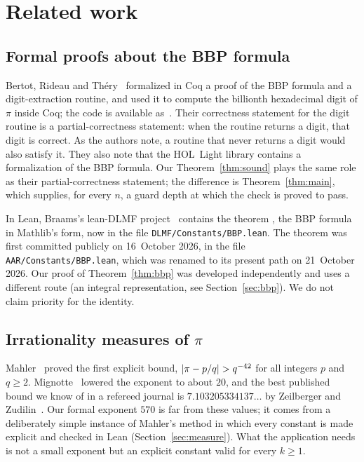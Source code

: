 \documentclass[11pt]{amsart}
\theoremstyle{definition}
\theoremstyle{remark}
\DeclarePairedDelimiter{\abs}{\lvert}{\rvert}
\begin{document}
\section{Related work}\label{sec:related}

\subsection*{Formal proofs about the BBP formula}
Bertot, Rideau and Th\'ery~\cite{BertotRideauThery2018} formalized in Coq a
proof of the BBP formula and a digit-extraction routine, and used it to
compute the billionth hexadecimal digit of $\pi$ inside Coq; the code is
available as~\cite{TheryPlouffe}. Their correctness statement for the digit
routine is a partial-correctness statement: when the routine returns a digit,
that digit is correct. As the authors note, a routine that never returns a
digit would also satisfy it. They also note that the HOL~Light library contains
a formalization of the BBP formula. Our Theorem~\ref{thm:sound} plays the same
role as their partial-correctness statement; the difference is
Theorem~\ref{thm:main}, which supplies, for every $n$, a guard depth at which
the check is proved to pass.

In Lean, Braams's lean-DLMF project~\cite{BraamsDLMF} contains the theorem
, the BBP formula in Mathlib's  form, now in
the file \texttt{DLMF/Constants/BBP.lean}. The theorem was first committed
publicly on 16~October 2026, in the file \texttt{AAR/Constants/BBP.lean},
which was renamed to its present path on 21~October 2026. Our proof of
Theorem~\ref{thm:bbp} was developed independently and uses a different
route (an integral representation, see Section~\ref{sec:bbp}). We do not claim
priority for the identity.

\subsection*{\texorpdfstring{Irrationality measures of $\pi$}{Irrationality measures of pi}}
Mahler~\cite{Mahler1953} proved the first explicit bound,
$\abs{\pi-p/q}>q^{-42}$ for all integers $p$ and $q\ge2$. Mignotte~\cite{Mignotte1974}
lowered the exponent to about $20$, and the best published bound we know of in a refereed
journal is $7.103205334137\ldots$ by Zeilberger and Zudilin~\cite{ZeilbergerZudilin2020}.
Our formal exponent $570$ is far from these values; it comes from a
deliberately simple instance of Mahler's method in which every constant is
made explicit and checked in Lean (Section~\ref{sec:measure}). What the
application needs is not a small exponent but an explicit constant valid for
every $k\ge1$.
\end{document}
